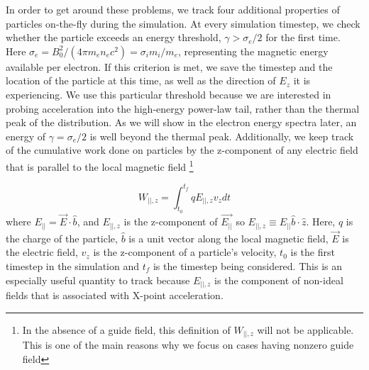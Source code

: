 %	
In order to get around these problems, we track four additional properties of particles on-the-fly during the simulation.  At every simulation timestep, we check whether the particle exceeds an energy threshold, $\gamma > \sigma_{e}/2$ for the first time.  Here $\sigma_{e}=B_{0}^{2}/(4 \pi m_{e} n_{e} c^{2})=\sigma_{i} m_{i}/m_{e}$, representing the magnetic energy available per electron.  If this criterion is met, we save the timestep and the location of the particle at this time, as well as the direction of $E_{z}$ it is experiencing.  We use this particular threshold because we are interested in probing acceleration into the high-energy power-law tail, rather than the thermal peak of the distribution.  As we will show in the electron energy spectra later, an energy of $\gamma=\sigma_{e}/2$ is well beyond the thermal peak.  Additionally, we keep track of the cumulative work done on particles by the z-component of any electric field that is parallel to the local magnetic field \footnote{In the absence of a guide field, this definition of $W_{||,z}$ will not be applicable.  This is one of the main reasons why we focus on cases having nonzero guide field}

\begin{equation}
	W_{||,z} = \int_{t_{0}}^{t_{f}}qE_{||,z}v_{z}dt
	\label{EQUATION_wparz}
\end{equation}
where $E_{||}=\vec{E}\cdot\hat{b}$, and $E_{||,z}$ is the z-component of $\vec{E_{||}}$ so $E_{||,z} \equiv E_{||}\hat{b}\cdot \hat{z}$.  Here, $q$ is the charge of the particle, $\hat{b}$ is a unit vector along the local magnetic field, $\vec{E}$ is the electric field, $v_{z}$ is the z-component of a particle's velocity, $t_{0}$ is the first timestep in the simulation and $t_{f}$ is the timestep being considered.  This is an especially useful quantity to track because $E_{||,z}$ is the component of non-ideal fields that is associated with X-point acceleration.

